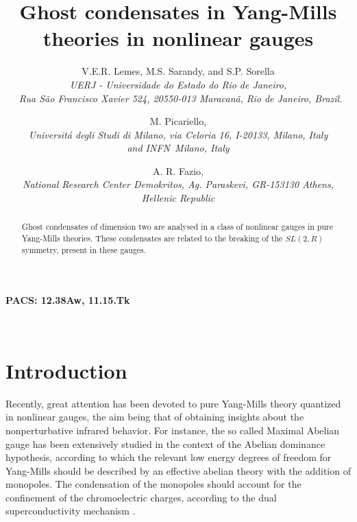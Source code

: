 \documentclass[a4paper,12pt]{article}
\begin{document}
\title{\textbf{Ghost condensates in Yang-Mills theories in nonlinear gauges } }
\author{V.E.R. Lemes, M.S. Sarandy, and S.P. Sorella \\
{\small {\textit{UERJ - Universidade do Estado do Rio de Janeiro,}}} \\
{\small {\textit{\ Rua S\~{a}o Francisco Xavier 524, 20550-013 Maracan\~{a}, 
}}} {\small {\textit{Rio de Janeiro, Brazil.}}} \and M. Picariello, \\
{\small {\textit{Universit\'{a} degli Studi di Milano, via Celoria 16,
I-20133, Milano, Italy }}}\\
{\small {\textit{and INFN\ Milano, Italy}}} \and A. R. Fazio, \\
{\small {\textit{National Research Center Demokritos, Ag. Paraskevi,
GR-153130 Athens, }}}\\
{\small {\textit{Hellenic Republic }}}}
\maketitle

\vspace{0.5cm}
{\centerline {\bf PACS: 12.38Aw, 11.15.Tk} }
\vspace{0.5cm}


\begin{abstract}
Ghost condensates of dimension two are analysed in a class of nonlinear
gauges in pure Yang-Mills theories. These condensates are related to the
breaking of the $SL(2,R)$ symmetry, present in these gauges. %
\end{abstract}

\vfill\newpage\ \makeatother

\renewcommand{\theequation}{\thesection.\arabic{equation}}

\section{Introduction}

Recently, great attention has been devoted to pure Yang-Mills theory
quantized in nonlinear gauges, the aim being that of obtaining insights
about the nonperturbative infrared behavior. For instance, the so called
Maximal Abelian gauge \cite{th,kr} has been extensively studied in the
context of the Abelian dominance hypothesis, according to which the relevant
low energy degrees of freedom for Yang-Mills should be described by an
effective abelian theory with the addition of monopoles. The condensation of
the monopoles should account for the confinement of the chromoelectric
charges, according to the dual superconductivity mechanism \cite{th,scon}.
\end{document}
